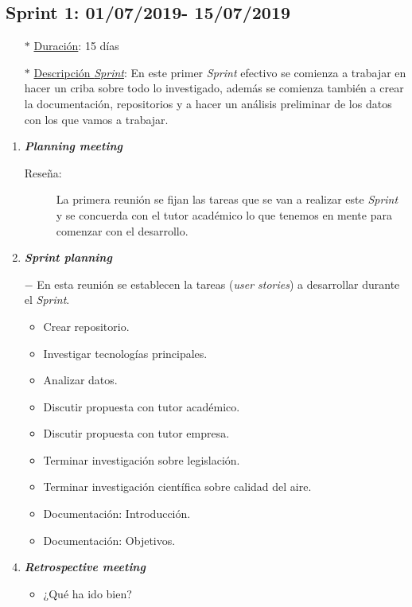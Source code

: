 \subsection{Sprint 1: 01/07/2019- 15/07/2019}\label{sprint1}
\begin{itemize}
\item[$\ast$] \underline{Duración}:  15 días
\item[$\ast$] \underline{Descripción \textit{Sprint}}: En este primer \textit{Sprint} efectivo se comienza a trabajar en hacer un criba sobre todo lo investigado, además se comienza también a crear la documentación, repositorios y a hacer un análisis preliminar de los datos con los que vamos a trabajar.
\end{itemize}
\begin{enumerate}
	\item \textbf{\textit{Planning meeting}}
	\begin{description}
		\item[Reseña:] La primera reunión se fijan las tareas que se van a realizar este \textit{Sprint} y se concuerda con el tutor académico lo que tenemos en mente para comenzar con el desarrollo.
	\end{description}
	\item \textbf{\textit{Sprint planning}}
	\item[$-$] En esta reunión se establecen la tareas (\textit{user stories}) a desarrollar durante el \textit{Sprint}. 
	\begin{itemize}
		\item Crear repositorio.
		\item Investigar tecnologías principales.
		\item Analizar datos.
		\item Discutir propuesta con tutor académico.
		\item Discutir propuesta con tutor empresa.
		\item Terminar investigación sobre legislación.
		\item Terminar investigación científica sobre calidad del aire.
		\item Documentación: Introducción.
		\item Documentación: Objetivos.
	\end{itemize}
	\item \textbf{\textit{Retrospective meeting}}
	\begin{itemize}
		\item ¿Qué ha ido bien?
		\begin{itemize}

\end{itemize}
\end{itemize}
\end{enumerate}
